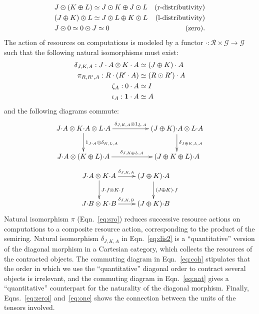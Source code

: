 \documentclass{article}
\newcommand{\catplus}{\varoplus}
\newcommand{\cattimes}{\varodot}
\begin{document}
\begin{align*}
  &J\cattimes(K\catplus L) \simeq J\cattimes K \catplus J\cattimes L&\text{(r-distributivity)}\\
  &(J\catplus K)\cattimes L \simeq J\cattimes L \catplus K\cattimes L&\text{(l-distributivity)}\\
  &J\cattimes 0 \simeq 0\cattimes J \simeq 0&\text{(zero)}.
\end{align*}
The action of resources on computations is modeled by a functor
$\cdot:\mathcal R\times\mathcal G\rightarrow \mathcal G$ such that the following natural isomorphisms must exist:
\begin{align}
  \delta_{J,K,A}: J\cdot A \otimes K\cdot A&\simeq(J\catplus K)\cdot A\label{eq:dis2}\\
  \pi_{R,R',A}: R\cdot(R'\cdot A)&\simeq (R\odot R')\cdot A \label{eq:sro}\\
  \zeta_A:0\cdot A &\simeq I\label{eq:zeroi}\\
  \iota_A:\mathbf 1 \cdot A &\simeq A\label{eq:one}
\end{align}
and the following diagrams commute:
\begin{equation}\label{eq:coh}
\xymatrix@C=12ex{
J{\cdot} A \otimes K{\cdot} A \otimes L{\cdot} A \ar[d]^{1_{J{\cdot}A}\otimes \delta_{K,L,A}} \ar[r]^-{\delta_{J,K,A}\otimes 1_{L{\cdot} A}} & (J\catplus K){\cdot} A\otimes L{\cdot} A \ar[d]^{\delta_{J\catplus K,L,A}}\\
J{\cdot} A \otimes (K\catplus L){\cdot} A \ar[r]^-{\delta_{J,K\catplus L, A}} & (J \catplus K\catplus L){\cdot} A 
}
\end{equation}
\begin{equation}\label{eq:nat}
\xymatrix{
J{\cdot}A\otimes K{\cdot} A \ar[d]^{J{\cdot}f\otimes K{\cdot}f} \ar[r]^{\delta_{J,K,A}}& (J\catplus K){\cdot} A\ar[d]^{(J\catplus K)\cdot f} \\
J{\cdot}B\otimes K{\cdot} B\ar[r]^{\delta_{J,K,B}} & (J\catplus K){\cdot} B 
}
\end{equation}
Natural isomorphism $\pi$ (Eqn.~\ref{eq:sro}) reduces successive resource actions on computations to a composite resource action, corresponding to the product of the semiring. 
Natural isomorphism $\delta_{J,K,A}$ in Eqn.~\ref{eq:dis2} is a ``quantitative'' version of the diagonal morphism in a Cartesian category, which collects the resources of the contracted objects. The commuting diagram in Eqn.~\ref{eq:coh} stipulates that the order in which we use the ``quantitative'' diagonal order to contract several objects is irrelevant, and the commuting diagram in Eqn.~\ref{eq:nat} gives a ``quantitative'' counterpart for the naturality of the diagonal morphism. Finally,  Eqns.~\ref{eq:zeroi} and~\ref{eq:one} shows the connection between the units of the tensors involved.
\end{document}

